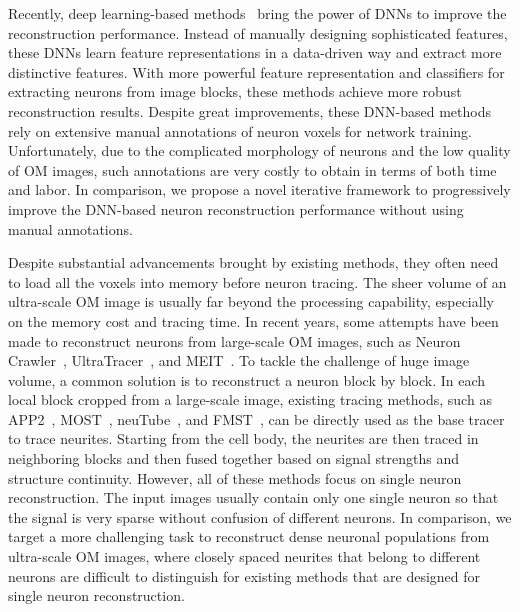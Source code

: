 Recently, deep learning-based methods~\cite{Li2017, Zhou2018, Xu2016, Kozinski-MIA2020} bring the power of DNNs to improve the reconstruction performance. 
Instead of manually designing sophisticated features, these DNNs learn feature representations in a data-driven way and extract more distinctive features. 
With more powerful feature representation and classifiers for extracting neurons from image blocks, these methods achieve more robust reconstruction results. 
Despite great improvements, these DNN-based methods rely on extensive manual annotations of neuron voxels for network training.
Unfortunately, due to the complicated morphology of neurons and the low quality of OM images, such annotations are very costly to obtain in terms of both time and labor.
%
In comparison, we propose a novel iterative framework to progressively improve the DNN-based neuron reconstruction performance without using manual annotations.



Despite substantial advancements brought by existing methods, they often need to load all the voxels into memory before neuron tracing.
The sheer volume of an ultra-scale OM image is usually far beyond the processing capability, especially on the memory cost and tracing time.
%
In recent years, some attempts have been made to reconstruct neurons from large-scale OM images, such as Neuron Crawler~\cite{Zhou2015}, UltraTracer~\cite{Peng2017}, and MEIT~\cite{Wang2018}.
To tackle the challenge of huge image volume, a common solution is to reconstruct a neuron block by block. 
In each local block cropped from a large-scale image, existing tracing methods, such as APP2~\cite{Xiao2013}, MOST~\cite{Wu2014}, neuTube~\cite{Feng2015}, and FMST~\cite{Yang2019}, can be directly used as the base tracer to trace neurites.
Starting from the cell body, the neurites are then traced in neighboring blocks and then fused together based on signal strengths and structure continuity.
%
However, all of these methods focus on single neuron reconstruction.
The input images usually contain only one single neuron so that the signal is very sparse without confusion of different neurons. 
%
In comparison, we target a more challenging task to reconstruct dense neuronal populations from ultra-scale OM images, where closely spaced neurites that belong to different neurons are difficult to distinguish for existing methods that are designed for single neuron reconstruction.

